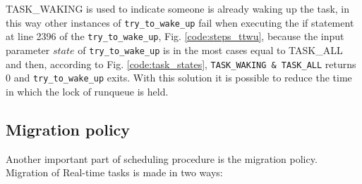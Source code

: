 TASK\_WAKING is used to indicate someone is already waking up the task, in this way other instances of \texttt{try\_to\_wake\_up} fail when executing 
the if statement at line 2396 of the \texttt{try\_to\_wake\_up}, Fig. \ref{code:steps_ttwu}, because the input parameter $state$ of 
\texttt{try\_to\_wake\_up} is in the most cases equal to TASK\_ALL and then, according to Fig. \ref{code:task_states}, 
\texttt{TASK\_WAKING \& TASK\_ALL} returns 0 and \texttt{try\_to\_wake\_up} exits. With this solution it is possible to reduce the time in which the 
lock of runqueue is held. 

\subsection{Migration policy}

Another important part of scheduling procedure is the migration policy. Migration of Real-time tasks is made in two ways: 

